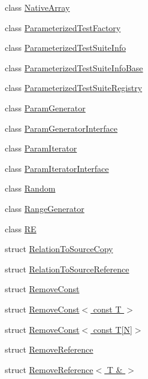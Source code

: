 \begin{DoxyCompactItemize}
class \hyperlink{classtesting_1_1internal_1_1NativeArray}{Native\+Array}
\item 
class \hyperlink{classtesting_1_1internal_1_1ParameterizedTestFactory}{Parameterized\+Test\+Factory}
\item 
class \hyperlink{classtesting_1_1internal_1_1ParameterizedTestSuiteInfo}{Parameterized\+Test\+Suite\+Info}
\item 
class \hyperlink{classtesting_1_1internal_1_1ParameterizedTestSuiteInfoBase}{Parameterized\+Test\+Suite\+Info\+Base}
\item 
class \hyperlink{classtesting_1_1internal_1_1ParameterizedTestSuiteRegistry}{Parameterized\+Test\+Suite\+Registry}
\item 
class \hyperlink{classtesting_1_1internal_1_1ParamGenerator}{Param\+Generator}
\item 
class \hyperlink{classtesting_1_1internal_1_1ParamGeneratorInterface}{Param\+Generator\+Interface}
\item 
class \hyperlink{classtesting_1_1internal_1_1ParamIterator}{Param\+Iterator}
\item 
class \hyperlink{classtesting_1_1internal_1_1ParamIteratorInterface}{Param\+Iterator\+Interface}
\item 
class \hyperlink{classtesting_1_1internal_1_1Random}{Random}
\item 
class \hyperlink{classtesting_1_1internal_1_1RangeGenerator}{Range\+Generator}
\item 
class \hyperlink{classtesting_1_1internal_1_1RE}{RE}
\item 
struct \hyperlink{structtesting_1_1internal_1_1RelationToSourceCopy}{Relation\+To\+Source\+Copy}
\item 
struct \hyperlink{structtesting_1_1internal_1_1RelationToSourceReference}{Relation\+To\+Source\+Reference}
\item 
struct \hyperlink{structtesting_1_1internal_1_1RemoveConst}{Remove\+Const}
\item 
struct \hyperlink{structtesting_1_1internal_1_1RemoveConst_3_01const_01T_01_4}{Remove\+Const$<$ const T $>$}
\item 
struct \hyperlink{structtesting_1_1internal_1_1RemoveConst_3_01const_01T[N]_4}{Remove\+Const$<$ const T\mbox{[}\+N\mbox{]}$>$}
\item 
struct \hyperlink{structtesting_1_1internal_1_1RemoveReference}{Remove\+Reference}
\item 
struct \hyperlink{structtesting_1_1internal_1_1RemoveReference_3_01T_01_6_01_4}{Remove\+Reference$<$ T \& $>$}

\end{DoxyCompactItemize}
